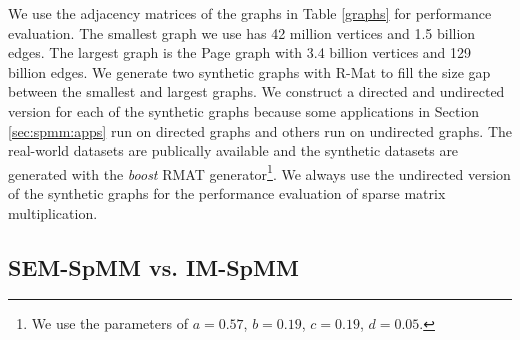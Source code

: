 We use the adjacency matrices of the graphs in Table \ref{graphs} for performance
evaluation. The smallest graph we use has 42 million vertices and 1.5 billion
edges. The largest graph is the Page graph with 3.4 billion vertices and 129
billion edges. We generate two synthetic graphs with R-Mat \cite{rmat} to fill
the size gap between the smallest and largest graphs. We construct a directed and
undirected version for each of the synthetic graphs because some applications
in Section \ref{sec:spmm:apps} run on directed graphs and others run on undirected
graphs. The real-world datasets are publically available and the synthetic
datasets are generated with the \textit{boost} RMAT generator\footnote{We use the 
parameters of $a=0.57$, $b=0.19$, $c=0.19$,
$d=0.05$.}. We always use the undirected version of the synthetic graphs for
the performance evaluation of sparse matrix multiplication.

\subsection{SEM-SpMM vs. IM-SpMM}

